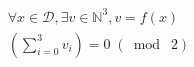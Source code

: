 \documentclass[border=2pt]{standalone}
\begin{document}
\begin{varwidth}{\linewidth}
  \begin{eqnarray*}
    \forall{x}\in\mathcal{D}, \exists{v}\in\mathbb{N}^3, v = f(x) \\
    \left ( \sum_{i=0}^{3} v_i \right ) = 0 \; ( \bmod \; 2)
  \end{eqnarray*}
\end{varwidth}
\end{document}
